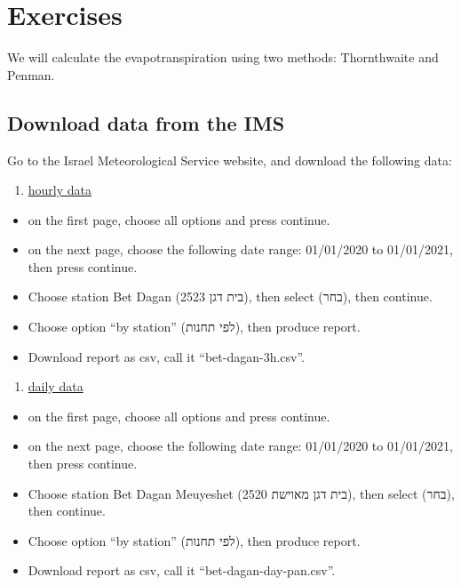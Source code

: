 \documentclass[
  letterpaper,
  DIV=11,
  numbers=noendperiod]{scrreprt}
\providecommand{\tightlist}{%
  \setlength{\itemsep}{0pt}\setlength{\parskip}{0pt}}\usepackage{longtable,booktabs,array}
\begin{document}
\hypertarget{exercises-4}{%
\chapter{Exercises}\label{exercises-4}}

We will calculate the evapotranspiration using two methods: Thornthwaite
and Penman.

\hypertarget{download-data-from-the-ims}{%
\section{Download data from the IMS}\label{download-data-from-the-ims}}

Go to the Israel Meteorological Service website, and download the
following data:

\begin{enumerate}
\def\labelenumi{\arabic{enumi}.}
\tightlist
\item
  \href{https://ims.data.gov.il/he/ims/1}{hourly data}
\end{enumerate}

\begin{itemize}
\tightlist
\item
  on the first page, choose all options and press continue.
\item
  on the next page, choose the following date range: 01/01/2020 to
  01/01/2021, then press continue.
\item
  Choose station Bet Dagan (בית דגן 2523), then select (בחר), then
  continue.
\item
  Choose option ``by station'' (לפי תחנות), then produce report.
\item
  Download report as csv, call it ``bet-dagan-3h.csv''.
\end{itemize}

\begin{enumerate}
\def\labelenumi{\arabic{enumi}.}
\setcounter{enumi}{1}
\tightlist
\item
  \href{https://ims.data.gov.il/he/ims/2}{daily data}
\end{enumerate}

\begin{itemize}
\tightlist
\item
  on the first page, choose all options and press continue.
\item
  on the next page, choose the following date range: 01/01/2020 to
  01/01/2021, then press continue.
\item
  Choose station Bet Dagan Meuyeshet (בית דגן מאוישת 2520), then select
  (בחר), then continue.
\item
  Choose option ``by station'' (לפי תחנות), then produce report.
\item
  Download report as csv, call it ``bet-dagan-day-pan.csv''.
\end{itemize}
\end{document}
